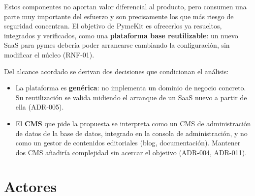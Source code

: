 Estos componentes no aportan valor diferencial al producto, pero consumen una
parte muy importante del esfuerzo y son precisamente los que más riesgo de
seguridad concentran. El objetivo de PymeKit es ofrecerlos ya resueltos,
integrados y verificados, como una \textbf{plataforma base reutilizable}: un
nuevo SaaS para pymes debería poder arrancarse cambiando la configuración, sin
modificar el núcleo (RNF-01).

Del alcance acordado se derivan dos decisiones que condicionan el análisis:

\begin{itemize}
  \item La plataforma es \textbf{genérica}: no implementa un dominio de
        negocio concreto. Su reutilización se valida midiendo el arranque de
        un SaaS nuevo a partir de ella (ADR-005).
  \item El \textbf{CMS} que pide la propuesta se interpreta como un CMS de
        administración de datos de la base de datos, integrado en la consola
        de administración, y no como un gestor de contenidos editoriales
        (blog, documentación). Mantener dos CMS añadiría complejidad sin
        acercar el objetivo (ADR-004, ADR-011).
\end{itemize}


\section{Actores}
\label{sec:actores}

